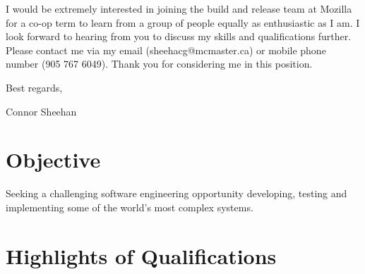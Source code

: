\documentclass[11pt,a4paper,sans]{moderncv}        %
\begin{document}
I would be extremely interested in joining the build and release team at Mozilla for a co-op term to learn from a group of people equally as enthusiastic as I am. I look forward to hearing from you to discuss my skills and qualifications further. Please contact me via my email (sheehacg@mcmaster.ca) or mobile phone number (905 767 6049). Thank you for considering me in this position.


Best regards,

Connor Sheehan

\makeletterclosing

\clearpage

\else
\makecvtitle

\section{Objective}
\begin{center}
Seeking a challenging software engineering opportunity developing, testing and implementing some of the world's most complex systems.
\end{center}


\hspace{1cm}

\section{Highlights of Qualifications}

\hspace{1cm}
\end{document}
